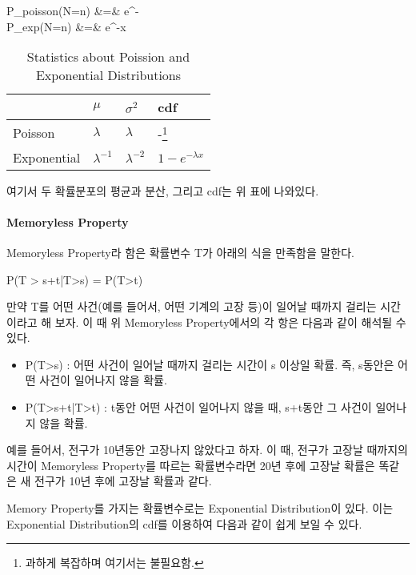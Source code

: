 \documentclass[twoside]{article}
\theoremstyle{definition}
\newenvironment{eq}{\equation}{\endequation}
\newenvironment{eqs}{\eqnarray}{\endeqnarray}
\begin{document}
\begin{eqs}
P_{poisson}(N=n) &=&  e^{-\lambda}\\
P_{exp}(N=n) &=& \lambda e^{-\lambda x} 
\end{eqs}


\begin{table}[h]
\centering
\begin{tabular}{|l|l|l|l|}
\hline
            & $\mu$ & $\sigma^2$ & cdf \\ \hline
Poisson     &   $\lambda$    &  $\lambda$          &  -\footnote{과하게 복잡하며 여기서는 불필요함.}   \\ \hline
Exponential &  $\lambda^{-1}$     &   $\lambda^{-2}$         &  $1-e^{- \lambda x}$    \\ \hline
\end{tabular}
\label{t:info}
\caption{Statistics about Poission and Exponential Distributions} 
\end{table}


여기서 두 확률분포의 평균과 분산, 그리고 cdf는 위 표에 나와있다. 


\paragraph{Memoryless Property}

Memoryless Property라 함은 확률변수 T가 아래의 식을 만족함을 말한다. 


\begin{eq} 
P(T > s+t|T>s) = P(T>t)
\end{eq}


만약 T를 어떤 사건(예를 들어서, 어떤 기계의 고장 등)이 일어날 때까지 걸리는 시간이라고 해 보자. 이 때 위 Memoryless Property에서의 각 항은 다음과 같이 해석될 수 있다. 

\begin{itemize} 
\item P(T>s) : 어떤 사건이 일어날 때까지 걸리는 시간이 s 이상일 확률. 즉, s동안은 어떤 사건이 일어나지 않을 확률.
\item P(T>s+t|T>t) : t동안 어떤 사건이 일어나지 않을 때, s+t동안 그 사건이 일어나지 않을 확률. 
\end{itemize}

예를 들어서, 전구가 10년동안 고장나지 않았다고 하자. 이 때, 전구가 고장날 때까지의 시간이 Memoryless Property를 따르는 확률변수라면 20년 후에 고장날 확률은 똑같은 새 전구가 10년 후에 고장날 확률과 같다. 


Memory Property를 가지는 확률변수로는 Exponential Distribution이 있다. 이는 Exponential Distribution의 cdf를 이용하여 다음과 같이 쉽게 보일 수 있다. 
\end{document}
